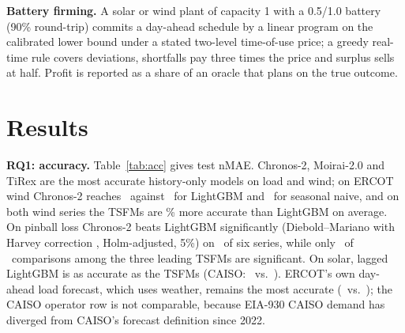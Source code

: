 \documentclass[conference]{IEEEtran}
\begin{document}
\textbf{Battery firming.} A solar or wind plant of capacity 1 with a 0.5/1.0 battery (90\% round-trip) commits a day-ahead schedule by a linear program on the calibrated lower bound under a stated two-level time-of-use price; a greedy real-time rule covers deviations, shortfalls pay three times the price and surplus sells at half. Profit is reported as a share of an oracle that plans on the true outcome.

\section{Results}
\textbf{RQ1: accuracy.} Table~\ref{tab:acc} gives test nMAE. Chronos-2, Moirai-2.0 and TiRex are the most accurate history-only models on load and wind; on ERCOT wind Chronos-2 reaches \nmaeChronosErcoWind\ against \nmaeLgbmErcoWind\ for LightGBM and \nmaeNaiveErcoWind\ for seasonal naive, and on both wind series the TSFMs are \windGainPct\% more accurate than LightGBM on average. On pinball loss Chronos-2 beats LightGBM significantly (Diebold--Mariano with Harvey correction \cite{diebold1995dm,harvey1997hln}, Holm-adjusted, 5\%) on \chronosBeatsLgbmSeries\ of six series, while only \topThreeSigPairs\ of \topThreePairsTotal\ comparisons among the three leading TSFMs are significant. On solar, lagged LightGBM is as accurate as the TSFMs (CAISO: \nmaeLgbmCisoSolar\ vs.\ \nmaeBestFmCisoSolar). ERCOT's own day-ahead load forecast, which uses weather, remains the most accurate (\nmaeOperatorErcoLoad\ vs.\ \nmaeBestFmErcoLoad); the CAISO operator row is not comparable, because EIA-930 CAISO demand has diverged from CAISO's forecast definition since 2022.

\begin{table}[t]
\caption{Test nMAE (normalized MAE of the median; solar daytime only) and mean native 80\% coverage. Bold: lowest per series; underlined: pinball loss not significantly worse than the best (DM, Holm, 5\%). The operator forecast is a point forecast with no native interval.}
\label{tab:acc}
\centering\footnotesize\setlength{\tabcolsep}{2.6pt}
\resizebox{\columnwidth}{!}{}
\end{table}
\end{document}
